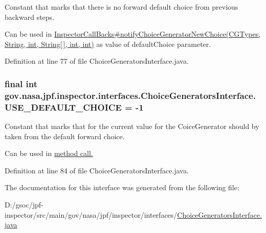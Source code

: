 Constant that marks that there is no forward default choice from previous backward steps. 

Can be used in \hyperlink{}{Inspector\+Call\+Backs\#notify\+Choice\+Generator\+New\+Choice(\+C\+G\+Types, String, int, String\mbox{[}$\,$\mbox{]}, int, int)} as value of default\+Choice parameter. 

Definition at line 77 of file Choice\+Generators\+Interface.\+java.

\subsubsection[{\texorpdfstring{U\+S\+E\+\_\+\+D\+E\+F\+A\+U\+L\+T\+\_\+\+C\+H\+O\+I\+CE}{USE_DEFAULT_CHOICE}}]{\setlength{\rightskip}{0pt plus 5cm}final int gov.\+nasa.\+jpf.\+inspector.\+interfaces.\+Choice\+Generators\+Interface.\+U\+S\+E\+\_\+\+D\+E\+F\+A\+U\+L\+T\+\_\+\+C\+H\+O\+I\+CE = -\/1\hspace{0.3cm}{\ttfamily [static]}}\hypertarget{interfacegov_1_1nasa_1_1jpf_1_1inspector_1_1interfaces_1_1_choice_generators_interface_ac57a2bb0eb101be2c2b27bd19cb81ea7}{}\label{interfacegov_1_1nasa_1_1jpf_1_1inspector_1_1interfaces_1_1_choice_generators_interface_ac57a2bb0eb101be2c2b27bd19cb81ea7}


Constant that marks that for the current value for the Coice\+Generator should by taken from the default forward choice. 

Can be used in \hyperlink{interfacegov_1_1nasa_1_1jpf_1_1inspector_1_1interfaces_1_1_choice_generators_interface_a055b8d48f863633614dee147bc607ed7}{method call. }

Definition at line 84 of file Choice\+Generators\+Interface.\+java.



The documentation for this interface was generated from the following file\+:\begin{DoxyCompactItemize}
\item 
D\+:/gsoc/jpf-\/inspector/src/main/gov/nasa/jpf/inspector/interfaces/\hyperlink{_choice_generators_interface_8java}{Choice\+Generators\+Interface.\+java}\end{DoxyCompactItemize}

